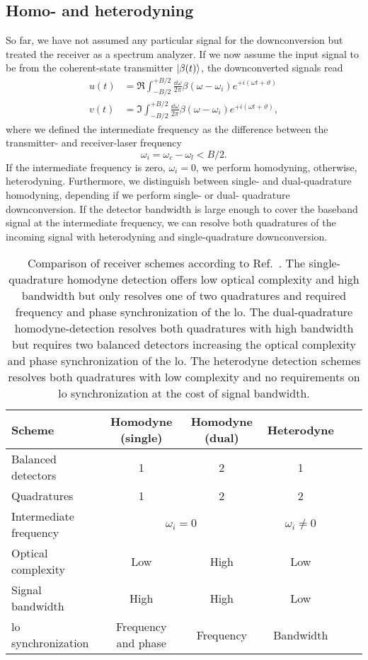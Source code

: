 \subsection{Homo- and heterodyning}

So far, we have not assumed any particular signal for the downconversion but treated the receiver as a spectrum analyzer.
If we now assume the input signal to be from the coherent-state transmitter $\lvert\beta(t)\rangle$, the downconverted signals read
\begin{align}
	u(t)
	&=
	\Re
	\int_{-B/2}^{+B/2}\frac{\dd{\omega}}{2\pi}
	\beta(\omega-\omega_i)
	e^{+i(\omega t+\vartheta)}
	\label{eq:receiver_demod_real}
	\\
	v(t)
	&=
	\Im
	\int_{-B/2}^{+B/2}\frac{\dd{\omega}}{2\pi}
	\beta(\omega-\omega_i)
	e^{+i(\omega t+\vartheta)}
	\label{eq:receiver_demod_imag}
	,
\end{align}
where we defined the intermediate frequency as the difference between the transmitter- and receiver-laser frequency
\begin{equation}
	\omega_i
	=
	\omega_c-\omega_l
	<
	B/2
	.
\end{equation}
If the intermediate frequency is zero, $\omega_i=0$, we perform homodyning, otherwise, heterodyning.
Furthermore, we distinguish between single- and dual-quadrature homodyning, depending if we perform single- or dual- quadrature downconversion.
If the detector bandwidth is large enough to cover the baseband signal at the intermediate frequency, we can resolve both quadratures of the incoming signal with heterodyning and single-quadrature downconversion.
\begin{table}[htb]
  \centering
  \begin{tabular}{lccccc}
    \toprule
    Scheme & Homodyne (single) & Homodyne (dual) & Heterodyne \\
    \midrule
    Balanced detectors & \num{1} & \num{2} & \num{1} \\
    Quadratures & \num{1} & \num{2} & \num{2} \\
    Intermediate frequency & \multicolumn{2}{c}{$\omega_i=0$} & $\omega_i\neq 0$ \\
    Optical complexity & Low & High & Low \\
    Signal bandwidth & High & High & Low \\
    \gls{lo} synchronization & Frequency and phase & Frequency & Bandwidth \\
    \bottomrule
  \end{tabular}
  \caption{Comparison of receiver schemes according to Ref.~\cite{Brunner2017}. The single-quadrature homodyne detection offers low optical complexity and high bandwidth but only resolves one of two quadratures and required frequency and phase synchronization of the \gls{lo}. The dual-quadrature homodyne-detection resolves both quadratures with high bandwidth but requires two balanced detectors increasing the optical complexity and phase synchronization of the \gls{lo}. The heterodyne detection schemes resolves both quadratures with low complexity and no requirements on \gls{lo} synchronization at the cost of signal bandwidth.}\label{tab:receivers}
\end{table}
